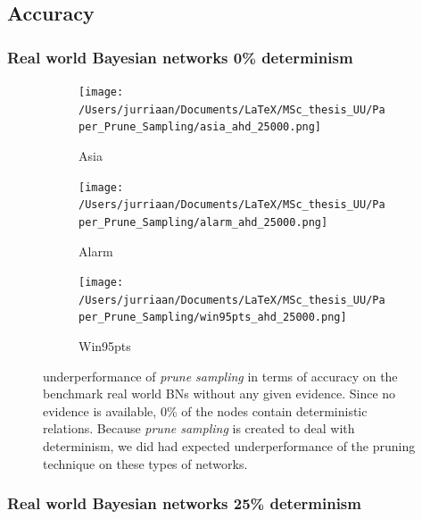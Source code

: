 \documentclass[a4paper, twoside, 11pt]{report}
\theoremstyle{plain}
\theoremstyle{definition}
\theoremstyle{remark}
\newcommand{\ps}{\textit{prune sampling }}
\begin{document}
\subsection{Accuracy}
\subsubsection{Real world Bayesian networks 0\% determinism}\label{real_world_no_evidence}

\begin{figure}[H]
\centering
\begin{subfigure}{0.5\textwidth}
\texttt{[image: /Users/jurriaan/Documents/LaTeX/MSc\_thesis\_UU/Paper\_Prune\_Sampling/asia\_ahd\_25000.png]}
\caption{Asia}%
\label{asia}%
\end{subfigure}\hfill%
\begin{subfigure}{0.5\textwidth}
\texttt{[image: /Users/jurriaan/Documents/LaTeX/MSc\_thesis\_UU/Paper\_Prune\_Sampling/alarm\_ahd\_25000.png]}
\caption{Alarm}%
\label{alarm}%
\end{subfigure}%
\begin{subfigure}{0.5\textwidth}
\texttt{[image: /Users/jurriaan/Documents/LaTeX/MSc\_thesis\_UU/Paper\_Prune\_Sampling/win95pts\_ahd\_25000.png]}
\caption{Win95pts}%
\label{win95pts}%
\end{subfigure}\hfill%
\vspace{0.75pc}
\caption{underperformance of \ps in terms of accuracy on the benchmark real world BNs without any given evidence. Since no evidence is available, 0\% of the nodes contain deterministic relations. Because \ps is created to deal with determinism, we did had expected underperformance of the pruning technique on these types of networks.  }
\label{results2}
\end{figure}

\newpage
\subsubsection{Real world Bayesian networks 25\% determinism}
\end{document}
